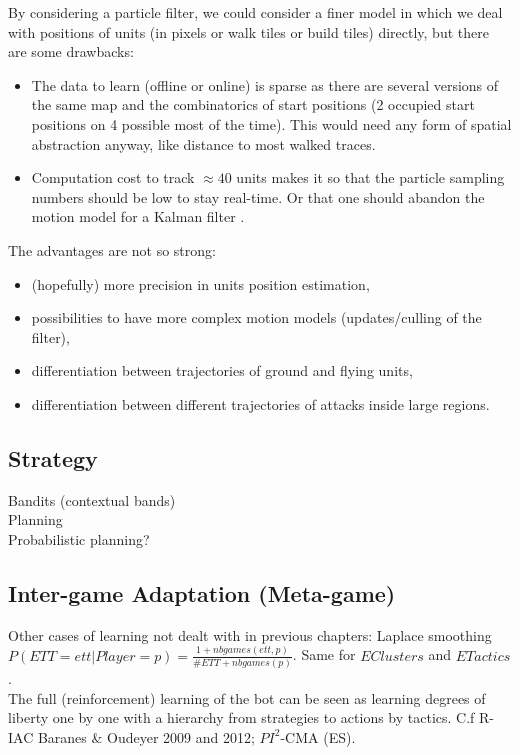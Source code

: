 By considering a particle filter, we could consider a finer model in which we deal with positions of units (in pixels or walk tiles or build tiles) directly, but there are some drawbacks:
\begin{itemize}
    \item The data to learn (offline or online) is sparse as there are several versions of the same map and the combinatorics of start positions (2 occupied start positions on 4 possible most of the time). This would need any form of spatial abstraction anyway, like distance to most walked traces.
    \item Computation cost to track $\approx 40$ units makes it so that the particle sampling numbers should be low to stay real-time. Or that one should abandon the motion model for a Kalman filter \citep{Kalman1960}. 
\end{itemize}
The advantages are not so strong: 
\begin{itemize}
    \item (hopefully) more precision in units position estimation,
    \item possibilities to have more complex motion models (updates/culling of the filter),
    \item differentiation between trajectories of ground and flying units,
    \item differentiation between different trajectories of attacks inside large regions.
\end{itemize}



\subsection{Strategy}
Bandits (contextual bands)\\
Planning \citep{Wolfe11}\\
Probabilistic planning?

\subsection{Inter-game Adaptation (Meta-game)}

Other cases of learning not dealt with in previous chapters:
\citep{metalevelbehavioradaptrts}
Laplace smoothing $P(ETT=ett|Player=p)= \frac{1 + nbgames(ett,p)}{\#ETT + nbgames(p)}$. Same for $EClusters$ and $ETactics$.\\

The full (reinforcement) learning of the bot can be seen as learning degrees of liberty one by one with a hierarchy from strategies to actions by tactics. C.f R-IAC Baranes \& Oudeyer 2009 and 2012; $PI^2$-CMA (ES).\\

